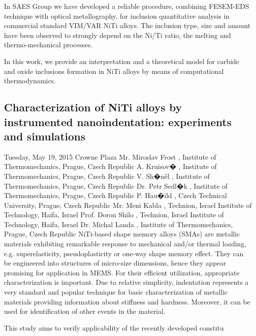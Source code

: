 \documentclass[12pt, a4paper]{article}
\begin{document}
In SAES Group we have developed a reliable procedure, combining FESEM-EDS technique with optical metallography, for inclusion quantitative analysis in commercial standard VIM/VAR NiTi alloys. The inclusion type, size and amount have been observed to strongly depend on the Ni/Ti ratio, the melting and thermo-mechanical processes.

In this work, we provide an interpretation and a theoretical model for carbide and oxide inclusions formation in NiTi alloys by means of computational thermodynamics.


\subsection*{Characterization of NiTi alloys by instrumented nanoindentation: experiments and simulations}
Tuesday, May 19, 2015
Crowne Plaza
Mr. Miroslav Frost , Institute of Thermomechanics, Prague, Czech Republic
A. Kruisov� , Institute of Thermomechanics, Prague, Czech Republic
V. Sh�něl , Institute of Thermomechanics, Prague, Czech Republic
Dr. Petr Sedl�k , Institute of Thermomechanics, Prague, Czech Republic
P. Hau�ild , Czech Technical University, Prague, Czech Republic
Mr. Meni Kabla , Technion, Israel Institute of Technology, Haifa, Israel
Prof. Doron Shilo , Technion, Israel Institute of Technology, Haifa, Israel
Dr. Michal Landa , Institute of Thermomechanics, Prague, Czech Republic
NiTi-based shape memory alloys (SMAs) are metallic materials exhibiting remarkable response to mechanical and/or thermal loading, e.g. superelasticity, pseudoplasticity or one-way shape memory effect. They can be engineered into structures of micro-size dimensions, hence they appear promising for application in MEMS. For their efficient utilization, appropriate characterization is important.
Due to relative simplicity, indentation represents a very standard and popular technique for basic characterization of metallic materials providing information about stiffness and hardness. Moreover, it can be used for identification of other events in the material.

This study aims to verify applicability of the recently developed constitu
\end{document}
